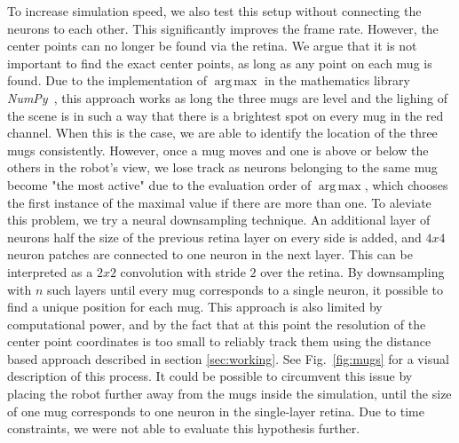 \documentclass[conference]{IEEEtran}
\DeclareMathOperator*{\argmax}{arg\,max}
\begin{document}
To increase simulation speed, we also test this setup without connecting the neurons to each other. This significantly improves the frame rate. However, the center points can no longer be found via the retina. We argue that it is not important to find the exact center points, as long as any point on each mug is found.
Due to the implementation of $\argmax$ in the mathematics library \textit{NumPy}~\cite{numpy}, this approach works as long the three mugs are level and the lighing of the scene is in such a way that there is a brightest spot on every mug in the red channel. When this is the case, we are able to identify the location of the three mugs consistently. However, once a mug moves and one is above or below the others in the robot's view, we lose track as neurons belonging to the same mug become "the most active" due to the evaluation order of $\argmax$, which chooses the first instance of the maximal value if there are more than one. To aleviate this problem, we try a neural downsampling technique. An additional layer of neurons half the size of the previous retina layer on every side is added, and $4x4$ neuron patches are connected to one neuron in the next layer. This can be interpreted as a $2x2$ convolution with stride $2$ over the retina. By downsampling with $n$ such layers until every mug corresponds to a single neuron, it possible to find a unique position for each mug. This approach is also limited by computational power, and by the fact that at this point the resolution of the center point coordinates is too small to reliably track them using the distance based approach described in section \ref{sec:working}. See Fig.~\ref{fig:mugs} for a visual description of this process. It could be possible to circumvent this issue by placing the robot further away from the mugs inside the simulation, until the size of one mug corresponds to one neuron in the single-layer retina. Due to time constraints, we were not able to evaluate this hypothesis further.
 
\end{document}
